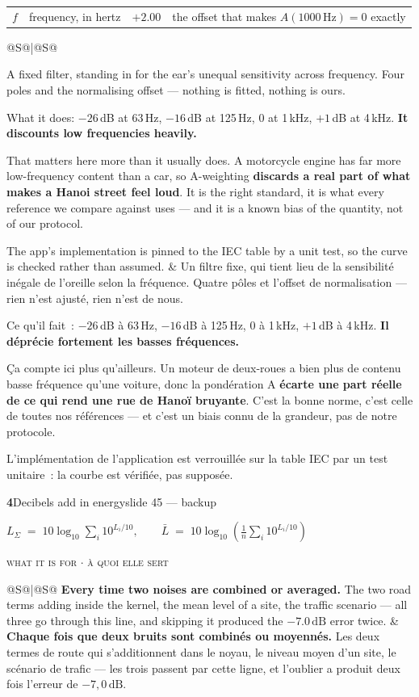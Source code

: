 \documentclass[10pt,a4paper]{article}
\makeatletter
\newcommand{\formula}[3]{%
  \par\vspace{5mm}\noindent
  \colorbox{accent}{\parbox{\dimexpr\textwidth-2\fboxsep}{%
    \color{white}\vspace{.6mm}
    \textbf{#1}\hspace{3mm}#2\hfill\small #3\vspace{.6mm}}}
  \par\vspace{2mm}}
\newcommand{\eq}[1]{%
  \par\vspace{1mm}\noindent
  \colorbox{wash}{\parbox{\dimexpr\textwidth-2\fboxsep}{%
    \vspace{2mm}\begin{center}$\displaystyle #1$\end{center}\vspace{1mm}}}
  \par\vspace{2mm}}
\newcommand{\forwhat}[2]{%
  \par\vspace{-1mm}\noindent
  {\footnotesize\color{good}\textsc{what it is for \; $\cdot$ \; à quoi elle sert}}
  \par\vspace{1mm}\noindent
  \begin{tabular}{@{}S@{\hspace{5mm}}|@{\hspace{5mm}}S@{}}
    #1 & #2
  \end{tabular}
  \par\vspace{2.5mm}}
\newenvironment{where}{%
  \par\vspace{.5mm}{\footnotesize\color{muted}\textsc{where}}\par\vspace{.8mm}
  \begin{tabular}{@{}p{20mm}p{62mm}@{\hspace{6mm}}p{20mm}p{62mm}@{}}
}{%
  \end{tabular}\par\vspace{2mm}}
\newenvironment{say}{%
  \begin{tabular}{@{}S@{\hspace{5mm}}|@{\hspace{5mm}}S@{}}
}{%
  \end{tabular}\par}
\newcommand{\dB}{\ensuremath{\,\mathrm{dB}}}  %
\newcommand{\must}[1]{{\color{good}\textbf{#1}}}
\newcommand{\care}[1]{{\color{warn}\textbf{#1}}}
\makeatother
\begin{document}
\begin{where}
  $f$ & frequency, in hertz &
  $+2.00$ & the offset that makes $A(1000\,\mathrm{Hz}) = 0$ exactly \\
\end{where}
\begin{say}
A fixed filter, standing in for the ear's unequal sensitivity across frequency.
Four poles and the normalising offset --- nothing is fitted, nothing is ours.

What it does: $-26$\,dB at 63\,Hz, $-16$\,dB at 125\,Hz, $0$ at 1\,kHz, $+1$\,dB
at 4\,kHz. \must{It discounts low frequencies heavily.}

That matters here more than it usually does. A motorcycle engine has far more
low-frequency content than a car, so A-weighting \care{discards a real part of
what makes a Hanoi street feel loud}. It is the right standard, it is what every
reference we compare against uses --- and it is a known bias of the quantity, not
of our protocol.

The app's implementation is pinned to the IEC table by a unit test, so the curve
is checked rather than assumed.
&
Un filtre fixe, qui tient lieu de la sensibilité inégale de l'oreille selon la
fréquence. Quatre pôles et l'offset de normalisation --- rien n'est ajusté, rien
n'est de nous.

Ce qu'il fait~: $-26$\,dB à 63\,Hz, $-16$\,dB à 125\,Hz, $0$ à 1\,kHz, $+1$\,dB à
4\,kHz. \must{Il déprécie fortement les basses fréquences.}

Ça compte ici plus qu'ailleurs. Un moteur de deux-roues a bien plus de contenu
basse fréquence qu'une voiture, donc la pondération A \care{écarte une part réelle
de ce qui rend une rue de Hanoï bruyante}. C'est la bonne norme, c'est celle de
toutes nos références --- et c'est un biais connu de la grandeur, pas de notre
protocole.

L'implémentation de l'application est verrouillée sur la table IEC par un test
unitaire~: la courbe est vérifiée, pas supposée.
\end{say}

\formula{4}{Decibels add in energy}{slide 45 --- backup}
\eq{L_{\Sigma} \;=\; 10\log_{10}\sum_{i} 10^{L_i/10},
    \qquad
    \bar L \;=\; 10\log_{10}\!\left(\frac{1}{n}\sum_{i} 10^{L_i/10}\right)}
\forwhat{\must{Every time two noises are combined or averaged.} The two road terms
    adding inside the kernel, the mean level of a site, the traffic scenario ---
    all three go through this line, and skipping it produced the $-7.0\dB$ error
    twice.}{\must{Chaque fois que deux bruits sont combinés ou moyennés.} Les deux
    termes de route qui s'additionnent dans le noyau, le niveau moyen d'un site,
    le scénario de trafic --- les trois passent par cette ligne, et l'oublier a
    produit deux fois l'erreur de $-7,0\dB$.}
\end{document}
